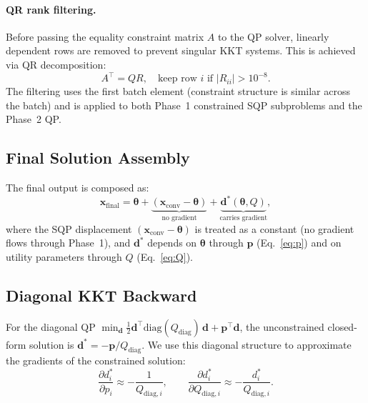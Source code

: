 \documentclass[11pt,a4paper]{article}
\newcommand{\xconv}{\mathbf{x}_{\mathrm{conv}}}
\newcommand{\xfinal}{\mathbf{x}_{\mathrm{final}}}
\newcommand{\thetapacked}{\boldsymbol{\theta}}
\begin{document}
\paragraph{QR rank filtering.}
Before passing the equality constraint matrix $A$ to the QP solver, linearly dependent rows are removed to prevent singular KKT systems.
This is achieved via QR decomposition:
\begin{equation}
    A^\top = QR, \quad \text{keep row } i \text{ if } |R_{ii}| > 10^{-8}.
    \label{eq:qr_filter}
\end{equation}
The filtering uses the first batch element (constraint structure is similar across the batch) and is applied to both Phase~1 constrained SQP subproblems and the Phase~2 QP.


\subsection{Final Solution Assembly}

The final output is composed as:
\begin{equation}
    \xfinal = \thetapacked + \underbrace{(\xconv - \thetapacked)}_{\text{no gradient}} + \underbrace{\mathbf{d}^*(\thetapacked, Q)}_{\text{carries gradient}},
    \label{eq:x_final}
\end{equation}
where the SQP displacement $(\xconv - \thetapacked)$ is treated as a constant (no gradient flows through Phase~1), and $\mathbf{d}^*$ depends on $\thetapacked$ through $\mathbf{p}$ (Eq.~\ref{eq:p}) and on utility parameters through $Q$ (Eq.~\ref{eq:Q}).


\subsection{Diagonal KKT Backward}
\label{sec:kkt_backward}

For the diagonal QP $\min_{\mathbf{d}} \frac{1}{2}\mathbf{d}^\top \mathrm{diag}(Q_{\mathrm{diag}})\, \mathbf{d} + \mathbf{p}^\top \mathbf{d}$, the unconstrained closed-form solution is $\mathbf{d}^* = -\mathbf{p} / Q_{\mathrm{diag}}$.
We use this diagonal structure to approximate the gradients of the constrained solution:
\begin{equation}
    \frac{\partial d^*_i}{\partial p_i} \approx -\frac{1}{Q_{\mathrm{diag},i}}, \qquad
    \frac{\partial d^*_i}{\partial Q_{\mathrm{diag},i}} \approx -\frac{d^*_i}{Q_{\mathrm{diag},i}}.
    \label{eq:grad_reattach}
\end{equation}
\end{document}
